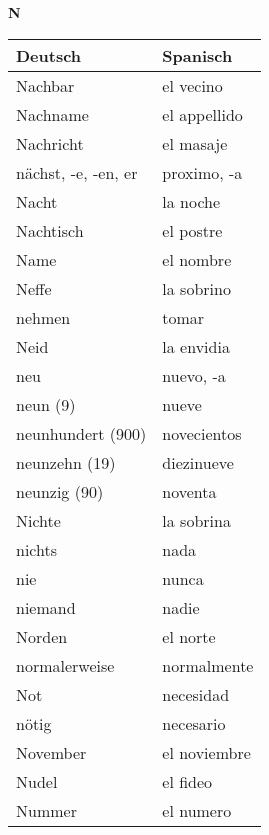 \begin{flushright}\begin{Huge}\textbf{N}\end{Huge}\end{flushright}

\begin{longtable}{p{} p{}} 
\textbf{Deutsch}     & \textbf{Spanisch}                                       \\ \hline
\hline
\endhead %
Nachbar & el vecino \\
Nachname & el appellido \\
Nachricht & el masaje\\
nächst, -e, -en, er & proximo, -a\\
Nacht & la noche \\
Nachtisch & el postre\\
Name & el nombre \\
Neffe & la sobrino\\
nehmen & tomar\\
Neid & la envidia \\
neu & nuevo, -a\\
neun (9) & nueve\\
neunhundert (900) & novecientos\\
neunzehn (19) & diezinueve\\
neunzig (90) & noventa\\
Nichte & la sobrina\\
nichts & nada\\
nie & nunca \\
niemand & nadie \\
Norden & el norte \\
normalerweise & normalmente\\
Not & necesidad \\
nötig & necesario\\
November & el noviembre \\
Nudel & el fideo\\
Nummer & el numero \\

\end{longtable}
